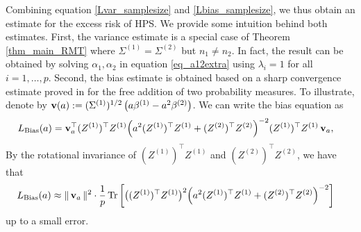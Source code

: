 Combining equation \eqref{Lvar_samplesize} and \eqref{Lbias_samplesize}, we thus obtain an estimate for the excess risk of HPS.
We provide some intuition behind both estimates.
First, the variance estimate is a special case of Theorem \ref{thm_main_RMT} where $\Sigma^{(1)} = \Sigma^{(2)}$ but $n_1 \neq n_2$.
In fact, the result can be obtained by solving $\alpha_1, \alpha_2$ in equation \eqref{eq_a12extra} using $\lambda_i = 1$ for all $i = 1,\dots, p$.
Second, the bias estimate is obtained based on a sharp convergence estimate proved in \citet{BES_free1,BES_free2} for the free addition of two probability measures.
To illustrate, denote by $\operatorname{\mathbf{v}}(a):=(\Sigma^{(1)})^{1/2}\left(a\beta^{(1)}- a^2\beta^{(2)}\right)$.
We can write the bias equation as
\begin{align*}
    L_{\bias} (a)&=\bv_a^\top (Z^{(1)})^\top Z^{(1)} { \left(a^2(Z^{(1)})^\top Z^{(1)}+ (Z^{(2)})^\top Z^{(2)}  \right)^{-2}}(Z^{(1)})^\top Z^{(1)} \bv_a,
\end{align*}
By the rotational invariance of $(Z^{(1)})^\top Z^{(1)}$ and $(Z^{(2)})^\top Z^{(2)}$, we have that
\begin{align}\label{Lbias_idea}
    L_{\bias} (a)&\approx \|\bv_a\|^2 \cdot \frac1p\bigtr{ \big((Z^{(1)})^\top Z^{(1)}\big)^2 { \left(a^2(Z^{(1)})^\top Z^{(1)}+ (Z^{(2)})^\top Z^{(2)}\right)^{-2}}}
\end{align}
up to a small error.

